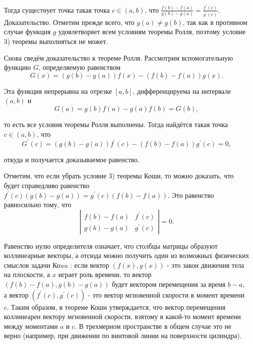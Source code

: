 Тогда сущестөует точка такая точка $c \in(a, b)$, что $\frac{f(b)-f(a)}{g(b)-g(a)}=\frac{f^{\prime}(c)}{g^{\prime}(c)}$.
Доказательство. Отметим прежде всего, что $g(a) \neq g(b)$, так как в противном случае функция $g$ удовлетворяет всем условиям теоремы Ролля, поэтому условие 3) теоремы выполняться не может.

Снова сведём доказательство к теореме Ролля. Рассмотрим вспомогательную функцию $G$, определяемую равенством
$$
G(x)=(g(b)-g(a)) f(x)-(f(b)-f(a)) g(x) .
$$

Эта функция непрерывна на отрезке $[a, b]$, дифференцируема на интервале $(a, b)$ и
$$
G(a)=g(b) f(a)-g(a) f(b)=G(b),
$$

то есть все условия теоремы Ролля выполнены. Тогда найдётся такая точка $c \in(a, b)$, что
$$
G^{\prime}(c)=(g(b)-g(a)) f^{\prime}(c)-(f(b)-f(a)) g^{\prime}(c)=0,
$$

откуда и получается доказываемое равенство.

Отметим, что если убрать условие 3) теоремы Коши, то можно доказать, что будет справедливо равенство $f^{\prime}(c)(g(b)-g(a))=g^{\prime}(c)(f(b)-f(a))$. Это равенство равносильно тому, что
$$
\left|\begin{array}{ll}
f(b)-f(a) & f^{\prime}(c) \\
g(b)-g(a) & g^{\prime}(c)
\end{array}\right|=0 .
$$

Равенство нулю определителя означает, что столбцы матрицы образуют коллинеарные векторы, а отсюда можно получить один из возможных физических смыслов задачи Ко$u u$ : если вектор $(f(x), g(x))$ - это закон движения тела на плоскости, а $x$ играет роль времени, то вектор $(f(b)-f(a), g(b)-g(a))$ будет вектором перемещения за время $b-a$, а вектор $\left(f^{\prime}(c), g^{\prime}(c)\right)$ - это вектор мгновенной скорости в момент времени $c$. Таким образом, в теореме Коши утверждается, что вектор перемещения коллинеарен вектору мгновенной скорости, взятому в какой-то момент времени между моментами $a$ и $c$. В трехмерном пространстве в общем случае это не верно (например, при движении по винтовой линии на поверхности цилиндра).
\newpage
